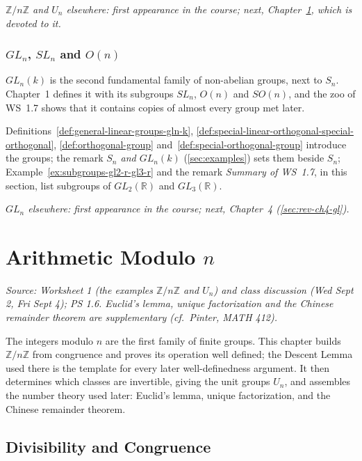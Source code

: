 \documentclass[11pt]{report}
\begin{document}
\textit{$\mathbb{Z}/n\mathbb{Z}$ and $U_n$ elsewhere: first appearance in the course; next, Chapter~\ref{ch:modn}, which is devoted to it.}

\subsection{\texorpdfstring{$GL_n$, $SL_n$ and $O(n)$}{GLₙ, SLₙ and O(n)}}\label{sec:rev-ch1-gl}

$GL_n(k)$ is the second fundamental family of non-abelian groups, next to $S_n$. Chapter~1 defines it with its subgroups $SL_n$, $O(n)$ and $SO(n)$, and the zoo of WS~1.7 shows that it contains copies of almost every group met later.

Definitions~\ref{def:general-linear-groups-gln-k}, \ref{def:special-linear-orthogonal-special-orthogonal}, \ref{def:orthogonal-group} and~\ref{def:special-orthogonal-group} introduce the groups; the remark \emph{$S_n$ and $GL_n(k)$} (\ref{sec:examples}) sets them beside $S_n$; Example~\ref{ex:subgroups-gl2-r-gl3-r} and the remark \emph{Summary of WS~1.7}, in this section, list subgroups of $GL_2(\mathbb{R})$ and $GL_3(\mathbb{R})$.

\textit{$GL_n$ elsewhere: first appearance in the course; next, Chapter~4 (\ref{sec:rev-ch4-gl}).}

\chapter{\texorpdfstring{Arithmetic Modulo $n$}{Arithmetic Modulo n}}\label{ch:modn}

\textit{Source: Worksheet 1 (the examples $\mathbb{Z}/n\mathbb{Z}$ and $U_n$) and class discussion (Wed Sept 2, Fri Sept 4); PS 1.6. Euclid's lemma, unique factorization and the Chinese remainder theorem are supplementary (cf.\ Pinter, MATH 412).}

The integers modulo $n$ are the first family of finite groups. This chapter builds $\mathbb{Z}/n\mathbb{Z}$ from congruence and proves its operation well defined; the Descent Lemma used there is the template for every later well-definedness argument. It then determines which classes are invertible, giving the unit groups $U_n$, and assembles the number theory used later: Euclid's lemma, unique factorization, and the Chinese remainder theorem.

\section{Divisibility and Congruence}\label{sec:divisibility}
\end{document}
